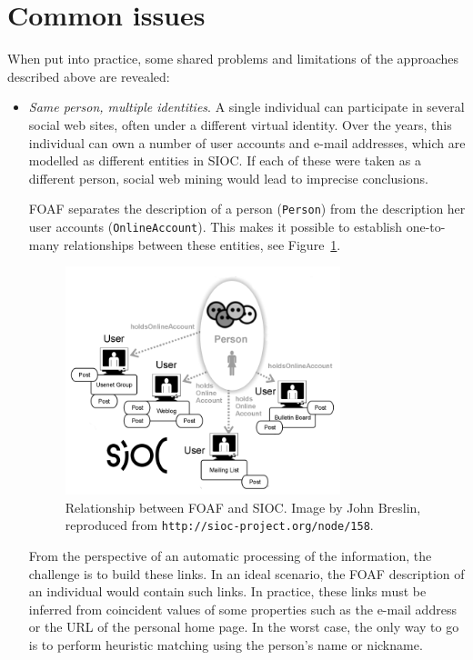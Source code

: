 \documentclass{../templates/www2008-submission}
\begin{document}
\section{Common issues}\label{sec:problems}

When put into practice, some shared problems and limitations
of the approaches described above are revealed:

\begin{itemize}
  \item \emph{Same person, multiple identities}. A single individual can
        participate in several social web sites, often under a different
        virtual identity. Over the years, this individual can own a
        number of user accounts and e-mail addresses, which are modelled
        as different entities in SIOC. If each of these were taken as
        a different person, social web mining would lead to imprecise
        conclusions.

        FOAF separates the description of a person
        (\texttt{Person})
        from the description her user accounts (\texttt{OnlineAccount}).
        This makes it possible to establish one-to-many relationships
        between these entities, see Figure~\ref{fig:foaf-sioc}.

	\begin{figure}[t]
	 \centering
	 \includegraphics[width=8cm]{images/foaf-sioc.png}
	 \caption{\label{fig:foaf-sioc}Relationship between FOAF and SIOC. Image by John Breslin, reproduced from \texttt{http://sioc-project.org/node/158}.}
	\end{figure}

        From the perspective of an automatic processing of the
        information, the challenge is to build these links. In an
        ideal scenario, the FOAF description of an individual would
        contain such links. In practice, these links must be
        inferred from coincident values of some properties such
        as the e-mail address or the URL of the personal home page.
        In the worst case, the only way to go is to perform heuristic matching
        using the person's name or nickname.


\end{itemize}
\end{document}
